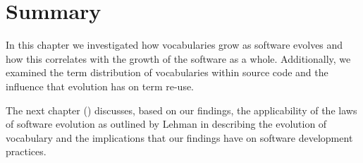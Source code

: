 
\section{Summary} %
\label{sec:summary}

In this chapter we investigated how vocabularies grow as software evolves and how this correlates with the growth of the software as a whole. Additionally, we examined the term distribution of vocabularies within source code and the influence that evolution has on term re-use.

The next chapter () discusses, based on our findings, the applicability of the laws of software evolution as outlined by Lehman \etal \cite{Lehman97a} in describing the evolution of vocabulary and the implications that our findings have on software development practices.


